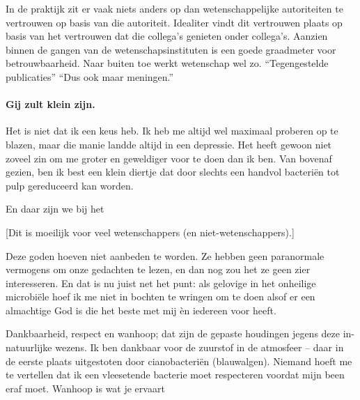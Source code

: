 \documentclass[12pt,a4paper]{article}
\begin{document}
In de praktijk zit er vaak niets anders op dan wetenschappelijke autoriteiten te vertrouwen op basis van die autoriteit. Idealiter vindt dit vertrouwen plaats op basis van het vertrouwen dat die collega's genieten onder collega's. Aanzien binnen de gangen van de wetenschapsinstituten is een goede graadmeter voor betrouwbaarheid. %
Naar buiten toe werkt wetenschap wel zo. “Tegengestelde publicaties” “Dus ook maar meningen.”


\paragraph{Gij zult klein zijn.} Het is niet dat ik een keus heb. Ik heb me altijd wel maximaal proberen op te blazen, maar die manie landde altijd in een depressie. Het heeft gewoon niet zoveel zin om me groter en geweldiger voor te doen dan ik ben. Van bovenaf gezien, ben ik best een klein diertje dat door slechts een handvol bacteriën tot pulp gereduceerd kan worden.

En daar zijn we bij het 

[Dit is moeilijk voor veel wetenschappers (en niet-wetenschappers).]


Deze goden hoeven niet aanbeden te worden. Ze hebben geen paranormale vermogens om onze gedachten te lezen, en dan nog zou het ze geen zier interesseren. En dat is nu juist net het punt: als gelovige in het onheilige microbiële hoef ik me niet in bochten te wringen om te doen alsof er een almachtige God is die het beste met mij èn iedereen voor heeft.

Dankbaarheid, respect en wanhoop; dat zijn de gepaste houdingen jegens deze in-natuurlijke wezens. Ik ben dankbaar voor de zuurstof in de atmosfeer – daar in de eerste plaats uitgestoten door cianobacteriën (blauwalgen). Niemand hoeft me te vertellen dat ik een vleesetende bacterie moet respecteren voordat mijn been eraf moet. Wanhoop is wat je ervaart 
\end{document}
